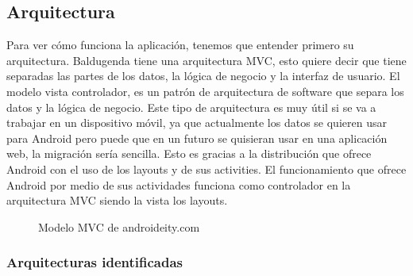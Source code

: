 \subsection{Arquitectura}
\label{subsecc:arquitectura}

Para ver cómo funciona la aplicación, tenemos que entender primero su arquitectura. Baldugenda tiene una arquitectura MVC, esto quiere decir que tiene separadas las partes de los datos, la lógica de negocio y la interfaz de usuario.
El modelo vista controlador, es un patrón de arquitectura de software que separa los datos y la lógica de negocio. Este tipo de arquitectura es muy útil si se va a trabajar en un dispositivo móvil, ya que actualmente los datos se quieren usar para Android pero puede que en un futuro se quisieran usar en una aplicación web, la migración sería sencilla. Esto es gracias a la distribución que ofrece Android con el uso de los layouts y de sus activities.
El funcionamiento que ofrece Android por medio de sus actividades funciona como controlador en la arquitectura MVC siendo la vista los layouts.
\newpage
\begin{figure}[H] 
  \begin{center} 
    \caption{Modelo MVC de androideity.com} 
    \label{fig:ModeloMVC} 
  \end{center} 
\end{figure}


\subsubsection{Arquitecturas identificadas}
\label{subsubsecc:Arquitecturas identificadas}

